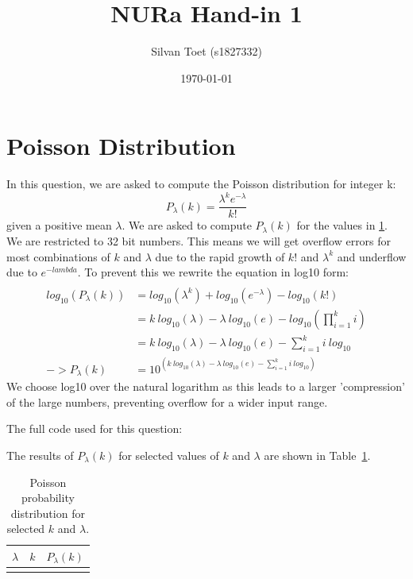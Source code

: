 \documentclass{article}
\title{NURa Hand-in 1}
\author{Silvan Toet (s1827332)}
\date{\today}
\newcommand{\CodeDir}{Code}
\begin{document}
\maketitle

\section{Poisson Distribution}
In this question, we are asked to compute the Poisson distribution for integer k:
\begin{equation}
  P_\lambda(k) = \frac{\lambda^k e^{-\lambda}}{k!}
\end{equation}
given a positive mean $\lambda$. We are asked to compute $P_\lambda(k)$ for the values in \ref{tab:poisson}.
We are restricted to 32 bit numbers. This means we will get overflow errors for most combinations of $k$ and $\lambda$ due to the rapid growth of $k!$ and $\lambda^{k}$ and underflow due to $e^{-lambda}$.
To prevent this we rewrite the equation in log10 form:
\begin{align}
  \\
  log_{10}(P_\lambda(k)) & = log_{10}(\lambda^k) + log_{10}(e^{-\lambda}) - log_{10}(k!)                    \\
                         & = k\ log_{10}(\lambda) - \lambda\ log_{10}(e) - log_{10}(\prod_{i=1}^{k} i)      \\
                         & = k\ log_{10}(\lambda) - \lambda\ log_{10}(e) - \sum_{i=1}^{k}i\ log_{10}        \\
  -> P_\lambda(k)        & = 10^{(k\ log_{10}(\lambda) - \lambda\ log_{10}(e) - \sum_{i=1}^{k}i\ log_{10})}
\end{align}
We choose log10 over the natural logarithm as this leads to a larger 'compression' of the large numbers, preventing overflow for a wider input range.


The full code used for this question:


The results of $P_\lambda(k)$ for selected values of $k$ and $\lambda$ are shown in Table~\ref{tab:poisson}.

\begin{table}[H]
  \centering
  \caption{Poisson probability distribution for selected $k$ and $\lambda$.}
  \label{tab:poisson}
  \begin{tabular}{|c|c|c|}
    \hline
    $\lambda$ & $k$ & $P_\lambda(k)$ \\
    \hline
           \\
    \hline
  \end{tabular}
\end{table}
\end{document}
